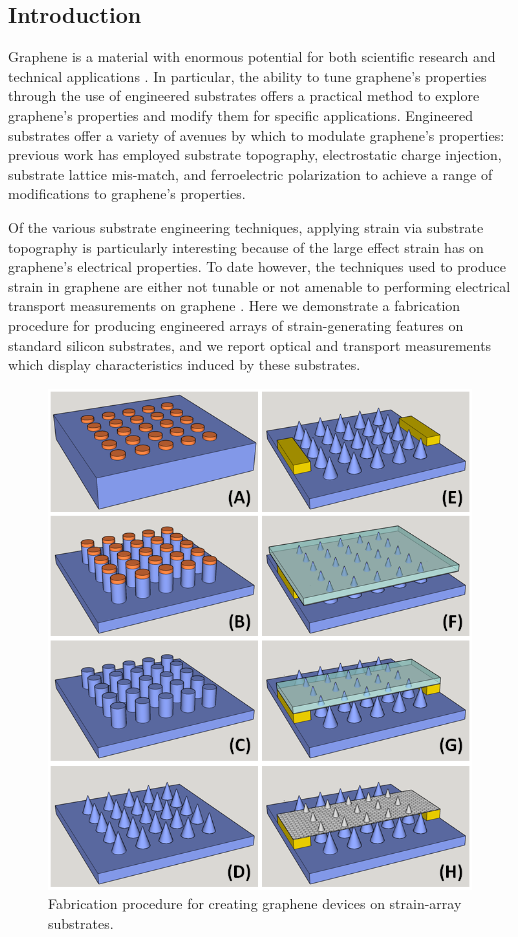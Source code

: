 \documentclass[edeposit,fullpage,draftthesis]{uiucthesis2009}
\begin{document}
            
    \subsection{Introduction}
    
            Graphene is a material with enormous potential for both scientific research and technical applications
            \cite{novoselov2004electric,novoselov2005two,zhang2005experimental,geim2007rise}.
            In particular, the ability to tune graphene's properties through the use of engineered substrates offers a practical
            method to explore graphene's properties and modify them for specific applications\cite{guinea2010energy, zhou2007substrate}.
            Engineered substrates offer a variety of avenues by which to modulate graphene's properties:
            previous work has employed substrate topography\cite{Tomori2011},
            electrostatic charge injection\cite{chiu2010controllable},
            substrate lattice mis-match\cite{zhou2007substrate},
            and ferroelectric polarization\cite{hinnefeld2016single}
            to achieve a range of modifications to graphene's properties.
             
            Of the various substrate engineering techniques, applying strain via substrate topography is particularly interesting
            because of the large effect strain has on graphene's electrical 
            properties\cite{guinea2010energy, pereira2009strain, levy2010strain}. 
            To date however, the techniques used to produce strain in graphene are either not tunable\cite{levy2010strain}
            or not amenable to performing electrical transport measurements on graphene
            \cite{Tomori2011, mohiuddin2009uniaxial, ni2008uniaxial, gill2015mechanical}.
            Here we demonstrate a fabrication procedure for producing engineered arrays of strain-generating features on standard silicon
            substrates, and we report optical and transport measurements which display characteristics induced by these substrates.
            
            \begin{figure}
            \centering
            \includegraphics[width=0.5\columnwidth]{images/resultsanddiscussion/strainarraypaper/Figure1}
            \caption{Fabrication procedure for creating graphene devices on strain-array substrates.}
            \label{'fig:fab'}
            \end{figure}
            
\end{document}
